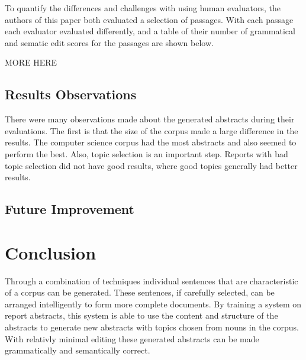 \documentclass[letterpaper, 10 pt, conference]{ieeeconf}  %
\begin{document}
To quantify the differences and challenges with using human evaluators, the authors of this paper both evaluated a selection of passages. With each passage each evaluator evaluated differently, and a table of their number of grammatical and sematic edit scores for the passages are shown below.

MORE HERE

\subsection{Results Observations}

There were many observations made about the generated abstracts during their evaluations. The first is that the size of the corpus made a large difference in the results. The computer science corpus had the most abstracts and also seemed to perform the best. Also, topic selection is an important step. Reports with bad topic selection did not have good results, where good topics generally had better results.


\subsection{Future Improvement}

 

\section{Conclusion}

Through a combination of techniques individual sentences that are characteristic of a corpus can be generated. These sentences, if carefully selected, can be arranged intelligently to form more complete documents. By training a system on report abstracts, this system is able to use the content and structure of the abstracts to generate new abstracts with topics chosen from nouns in the corpus. With relativly minimal editing these generated abstracts can be made grammatically and semantically correct.

\addtolength{\textheight}{-12cm}   %
\end{document}
